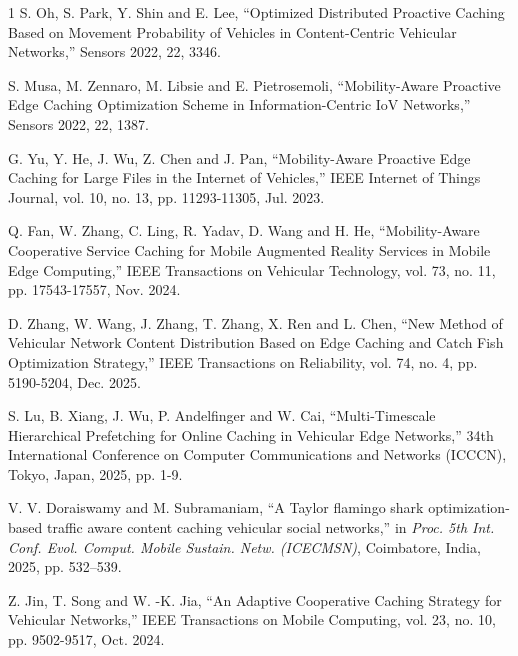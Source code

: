 \begin{thebibliography}{1}
S. Oh, S. Park, Y. Shin and E. Lee, ``Optimized Distributed Proactive Caching Based on Movement Probability of Vehicles in Content-Centric Vehicular Networks,'' Sensors 2022, 22, 3346. 


S. Musa, M. Zennaro, M. Libsie and E. Pietrosemoli, ``Mobility-Aware Proactive Edge Caching Optimization Scheme in Information-Centric IoV Networks,'' Sensors 2022, 22, 1387.


G. Yu, Y. He, J. Wu, Z. Chen and J. Pan, ``Mobility-Aware Proactive Edge Caching for Large Files in the Internet of Vehicles,'' IEEE Internet of Things Journal, vol. 10, no. 13, pp. 11293-11305, Jul. 2023.

Q. Fan, W. Zhang, C. Ling, R. Yadav, D. Wang and H. He, ``Mobility-Aware Cooperative Service Caching for Mobile Augmented Reality Services in Mobile Edge Computing,'' IEEE Transactions on Vehicular Technology, vol. 73, no. 11, pp. 17543-17557, Nov. 2024.


D. Zhang, W. Wang, J. Zhang, T. Zhang, X. Ren and L. Chen, ``New Method of Vehicular Network Content Distribution Based on Edge Caching and Catch Fish Optimization Strategy,'' IEEE Transactions on Reliability, vol. 74, no. 4, pp. 5190-5204, Dec. 2025.

S. Lu, B. Xiang, J. Wu, P. Andelfinger and W. Cai, ``Multi-Timescale Hierarchical Prefetching for Online Caching in Vehicular Edge Networks,'' 34th International Conference on Computer Communications and Networks (ICCCN), Tokyo, Japan, 2025, pp. 1-9.

V. V. Doraiswamy and M. Subramaniam, ``A Taylor flamingo shark optimization-based traffic aware content caching vehicular social networks,'' in \emph{Proc. 5th Int. Conf. Evol. Comput. Mobile Sustain. Netw. (ICECMSN)}, Coimbatore, India, 2025, pp. 532--539.

Z. Jin, T. Song and W. -K. Jia, ``An Adaptive Cooperative Caching Strategy for Vehicular Networks,'' IEEE Transactions on Mobile Computing, vol. 23, no. 10, pp. 9502-9517, Oct. 2024.



\end{thebibliography}
